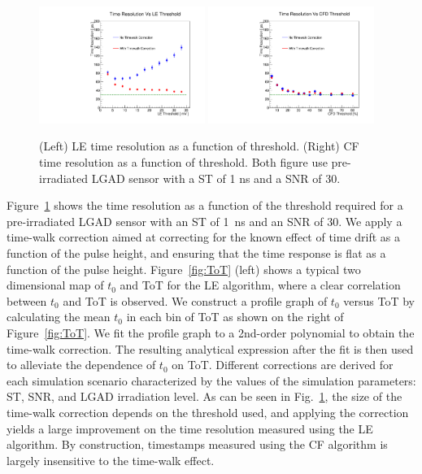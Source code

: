 \documentclass[preprint,1p]{elsarticle}
\begin{document}
  \begin{figure}[htbp]
    \centering
    \includegraphics[width=0.48\textwidth]{figs/ShapingTime1p0_SNR30_55MicronGain15Prerad_FIXED_NOISE_FIXED_SNR_V2_converted_TimeResolutionVsThresholdToT.pdf} \hfill
    \includegraphics[width=0.48\textwidth]{figs/ShapingTime1p0_SNR30_55MicronGain15Prerad_FIXED_NOISE_FIXED_SNR_V2_converted_TimeResolutionVsThresholdCFD.pdf}
    \caption{(Left) LE time resolution as a function of threshold.
    (Right) CF time resolution as a function of threshold.
    Both figure use pre-irradiated LGAD sensor with a ST of 1 ns and a SNR of 30.}
    \label{fig:time_resolution_scan}
  \end{figure}

Figure~\ref{fig:time_resolution_scan} shows the time resolution as a function
of the threshold required for a pre-irradiated LGAD sensor with an ST of 1~\si{ns} and an SNR of 30.
We apply a time-walk correction aimed at correcting for the known effect of time drift as a function
of the pulse height, and ensuring that the time response is flat as a function of the pulse height. 
Figure~\ref{fig:ToT} (left) shows a typical two dimensional map of $t_{0}$ and ToT for the
LE algorithm, where a clear correlation between $t_{0}$ and ToT is observed. 
We construct a profile graph of $t_{0}$ versus ToT by calculating the mean $t_{0}$ in
each bin of ToT as shown on the right of Figure~\ref{fig:ToT}. We fit the profile graph to a 2nd-order polynomial to 
obtain the time-walk correction. The resulting analytical expression after the fit is then used to 
alleviate the dependence of $t_{0}$ on ToT. Different corrections are derived for each simulation scenario
characterized by the values of the simulation parameters: ST, SNR, and LGAD irradiation level.
As can be seen in Fig.~\ref{fig:time_resolution_scan}, the size of the time-walk correction 
depends on the threshold used, and applying the correction yields a large 
improvement on the time resolution measured using the LE algorithm. By construction, 
timestamps measured using the CF algorithm is largely insensitive to the time-walk effect.
\end{document}
